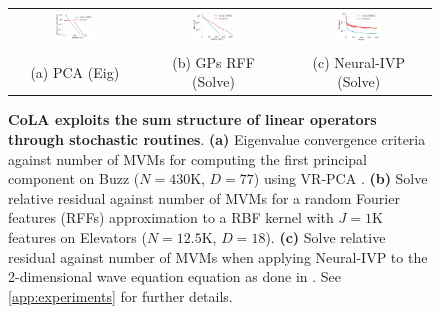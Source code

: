 \documentclass{article}
\begin{document}
\begin{figure}[t!]
    \centering
    \begin{tabular}{ccc}
      \hspace{-2em}
    \includegraphics[width=0.34\textwidth]{./figs/pca_svrg_eig.pdf}
      &
      \hspace{-2em}
    \includegraphics[width=0.34\textwidth]{./figs/rff_solve.pdf}
      &
      \hspace{-2em}
    \includegraphics[width=0.34\textwidth]{./figs/nivp_solve.pdf}
    \vspace{-1.2em}
    \\
      (a) PCA (Eig) & (b) GPs RFF (Solve) & (c) Neural-IVP (Solve)
    \end{tabular}
    \caption{
      \textbf{CoLA exploits the sum structure of linear operators through stochastic routines}.
      \textbf{(a)} Eigenvalue convergence criteria against number of MVMs
      for computing the first principal component on Buzz ($N=430$K, $D=77$) using VR-PCA \citep{shamir2015stochastic}.
      \textbf{(b)} Solve relative residual against
      number of MVMs for a random Fourier features (RFFs) approximation \citep{rahimi2007randomfeatures} to a RBF kernel with $J=1$K features on
      Elevators ($N=12.5$K, $D=18$).
      \textbf{(c)} Solve relative residual against number of MVMs when applying Neural-IVP \citep{finzi2023nivp}
      to the 2-dimensional wave equation equation as done in \citep{finzi2023nivp}.
      See \autoref{app:experiments} for further details.
    }
    \vspace{-1.2em}
    \label{fig:rnla}
\end{figure}
\end{document}
